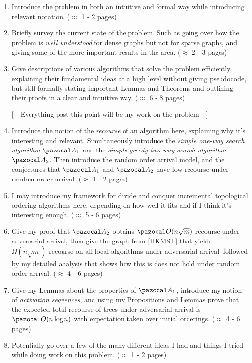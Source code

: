 \documentclass{article}
\begin{document}
\begin{enumerate}
    \item Introduce the problem in both an intuitive and formal way while introducing relevant notation. ($\approx$ 1 - 2 pages)
    
    \item Briefly survey the current state of the problem. Such as going over how the problem is \textit{well understood} for dense graphs but not for sparse graphs, and giving some of the more important results in the area. ($\approx$ 2 - 3 pages)
    
    \item Give descriptions of various algorithms that solve the problem efficiently, explaining their fundamental ideas at a high level without giving pseudocode, but still formally stating important Lemmas and Theorems and outlining their proofs in a clear and intuitive way. ($\approx$ 6 - 8 pages)
    
    [ - Everything past this point will be my work on the problem - ]
    
    \item Introduce the notion of the \textit{recourse} of an algorithm here, explaining why it's interesting and relevant. Simultaneously introduce the \textit{simple one-way search algorithm} $\pazocal A_1$ and the \textit{simple greedy two-way search algorithm} $\pazocal A_2$. Then introduce the random order arrival model, and the conjectures that $\pazocal A_1$ and $\pazocal A_2$ have low recourse under random order arrival. ($\approx$ 1 - 2 pages)
    
    \item I may introduce my framework for divide and conquer incremental topological ordering algorithms here, depending on how well it fits and if I think it's interesting enough. ($\approx$ 5 - 6 pages)
    
    \item Give my proof that $\pazocal A_2$ obtains $\pazocal O(n \sqrt m)$ recourse under adversarial arrival, then give the graph from [HKMST] that yields $\Omega(n \sqrt m)$ recourse on all local algorithms under adversarial arrival, followed by my detailed analysis that shows how this is does not hold under random order arrival. ($\approx$ 4 - 6 pages)
    
    \item Give my Lemmas about the properties of $\pazocal A_1$, introduce my notion of \textit{activation sequences}, and using my Propositions and Lemmas prove that the expected total recourse of trees under adversarial arrival is $\pazocal O(n \log n)$ with expectation taken over initial orderings. ($\approx$ 4 - 6 pages)
    
    \item Potentially go over a few of the many different ideas I had and things I tried while doing work on this problem. ($\approx$ 1 - 2 pages)
\end{enumerate}
\end{document}
